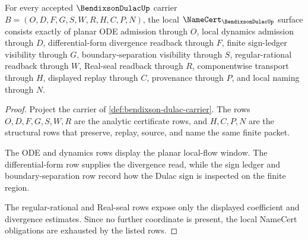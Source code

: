 \begin{theorem}
\label{thm:bendixson-dulac-namecert-obligations}
For every accepted $\BendixsonDulacUp$ carrier $B=(O,D,F,G,S,W,R,H,C,P,N)$, the local $\NameCert_{\BendixsonDulacUp}$ surface consists exactly of planar ODE admission through $O$, local dynamics admission through $D$, differential-form divergence readback through $F$, finite sign-ledger visibility through $G$, boundary-separation visibility through $S$, regular-rational readback through $W$, Real-seal readback through $R$, componentwise transport through $H$, displayed replay through $C$, provenance through $P$, and local naming through $N$.
\end{theorem}
\begin{proof}
Project the carrier of \autoref{def:bendixson-dulac-carrier}. The rows $O,D,F,G,S,W,R$ are the analytic certificate rows, and $H,C,P,N$ are the structural rows that preserve, replay, source, and name the same finite packet.

The ODE and dynamics rows display the planar local-flow window. The differential-form row supplies the divergence read, while the sign ledger and boundary-separation row record how the Dulac sign is inspected on the finite region.

The regular-rational and Real-seal rows expose only the displayed coefficient and divergence estimates. Since no further coordinate is present, the local NameCert obligations are exhausted by the listed rows.
\end{proof}

